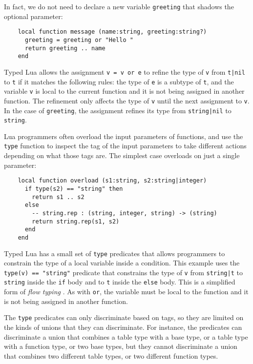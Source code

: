 In fact, we do not need to declare a new variable \texttt{greeting} that
shadows the optional parameter:
\begin{verbatim}
    local function message (name:string, greeting:string?)
      greeting = greeting or "Hello "
      return greeting .. name
    end
\end{verbatim}

Typed Lua allows the assignment \texttt{v = v or e} to refine
the type of \texttt{v} from \texttt{t|nil} to \texttt{t}
if it matches the following rules: 
the type of \texttt{e} is a subtype of \texttt{t},
and the variable \texttt{v} is local to the current function
and it is not being assigned in another function.
The refinement only affects the type of \texttt{v} until the
next assignment to \texttt{v}.
In the case of \texttt{greeting}, the assignment refines its type
from \texttt{string|nil} to \texttt{string}. 

Lua programmers often overload the input parameters of functions,
and use the \texttt{type} function to inspect the tag of the
input parameters to take different actions depending on what
those tags are.
The simplest case overloads on just a single parameter:
\begin{verbatim}
    local function overload (s1:string, s2:string|integer)
      if type(s2) == "string" then
        return s1 .. s2
      else
        -- string.rep : (string, integer, string) -> (string)
        return string.rep(s1, s2)
      end
    end
\end{verbatim}

Typed Lua has a small set of \texttt{type} predicates that allows
programmers to constrain the type of a local variable inside a condition.
This example uses the \texttt{type(v) == "string"} predicate that
constrains the type of \texttt{v} from \texttt{string|t} to
\texttt{string} inside the \texttt{if} body and to \texttt{t}
inside the \texttt{else} body. 
This is a simplified form of \emph{flow typing} \citep{guha2011tlc,tobin-hochstadt2010ltu}.
As with \texttt{or}, the variable must be local to the function
and it is not being assigned in another function.

The \texttt{type} predicates can only discriminate based on tags,
so they are limited on the kinds of unions that they can discriminate.
For instance, the predicates can discriminate a union that combines
a table type with a base type, or a table type with a function type,
or two base types, but they cannot discriminate a union that combines
two different table types, or two different function types.

